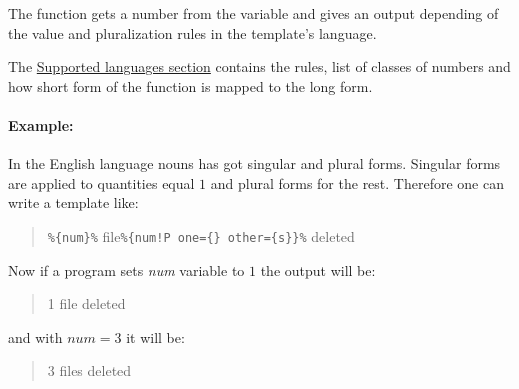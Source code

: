 The function gets a number from the variable and gives an output depending of the value and pluralization rules in the template's language.

The \hyperref[supLangs]{Supported languages section} contains the rules, list of classes of numbers and how short form of the function is mapped to the long form.

\paragraph{Example:} In the English language nouns has got singular and plural forms. Singular forms are applied to quantities equal $1$ and plural forms for the rest.
Therefore one can write a template like:
\begin{quote}
	\verb+%{num}%+ file\verb+%{num!P one={} other={s}}%+ deleted
\end{quote}
Now if a program sets \textit{num} variable to $1$ the output will be:
\begin{quote}
	1 file deleted
\end{quote}
and with $num=3$ it will be:
\begin{quote}
	3 files deleted
\end{quote}

